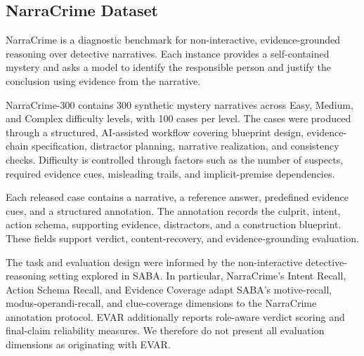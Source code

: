 \subsection{NarraCrime Dataset}
\label{sec:narracrime}

NarraCrime is a diagnostic benchmark for non-interactive, evidence-grounded reasoning over detective narratives. Each instance provides a self-contained mystery and asks a model to identify the responsible person and justify the conclusion using evidence from the narrative.

NarraCrime-300 contains 300 synthetic mystery narratives across Easy, Medium, and Complex difficulty levels, with 100 cases per level. The cases were produced through a structured, AI-assisted workflow covering blueprint design, evidence-chain specification, distractor planning, narrative realization, and consistency checks. Difficulty is controlled through factors such as the number of suspects, required evidence cues, misleading trails, and implicit-premise dependencies.

Each released case contains a narrative, a reference answer, predefined evidence cues, and a structured annotation. The annotation records the culprit, intent, action schema, supporting evidence, distractors, and a construction blueprint. These fields support verdict, content-recovery, and evidence-grounding evaluation.

The task and evaluation design were informed by the non-interactive detective-reasoning setting explored in SABA. In particular, NarraCrime's Intent Recall, Action Schema Recall, and Evidence Coverage adapt SABA's motive-recall, modus-operandi-recall, and clue-coverage dimensions to the NarraCrime annotation protocol. EVAR additionally reports role-aware verdict scoring and final-claim reliability measures. We therefore do not present all evaluation dimensions as originating with EVAR.
